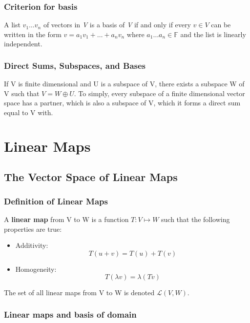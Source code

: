 \documentclass{article}
\begin{document}
\subsubsection{Criterion for basis}
A list \(v_{1} \ldots v_{n}  \) of vectors in \textit{V} is a basis of \textit{V} if and only if every \( v \in V\) can be written in the form \( v = a_{1}v_{1} + \ldots + a_{n}v_{n}  \) where \( a_{1} \ldots a_{n} \in \mathbb{F} \) and the list is linearly independent.

\subsubsection{Direct Sums, Subspaces, and Bases}
If V is finite dimensional and U is a subspace of V, there exists a subspace W of V such that \( V = W \oplus U \). To simply, every subspace of a finite dimensional vector space has a partner, which is also a subspace of V, which it forms a direct sum equal to V with.


\section{Linear Maps}
\subsection{The Vector Space of Linear Maps}

\subsubsection{Definition of Linear Maps}
A \textbf{linear map} from V to W is a function \(  T: V \mapsto W  \) such that the following properties are true:

\begin{itemize}

\item Additivity: \[ T(u+v) = T(u) + T(v) \]

\item Homogeneity: \[ T( \lambda v) = \lambda (Tv) \]

\end{itemize}

The set of all linear maps from V to W is denoted \(  \mathcal{L} (V,W)   \).

\subsubsection{Linear maps and basis of domain}
\end{document}
